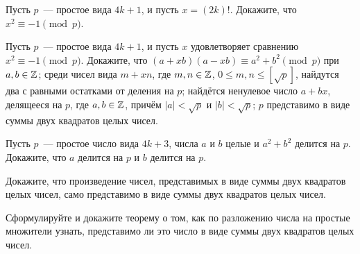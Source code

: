 \documentclass[a4paper,12pt]{article}
\begin{document}








 Пусть $p$~--- простое вида $4k + 1$, и пусть $x=(2k)!$. Докажите, что
$x^2 \equiv -1 \pmod{p}$.

 Пусть $p$~--- простое вида $4k + 1$, и пусть $x$ удовлетворяет сравнению $x^2 \equiv -1 \pmod{p}$. Докажите, что
 $(a + xb)(a - xb)\equiv a^2 + b^2 \pmod{p}$ при $a,b\in\mathbb{Z}$;
 среди чисел вида $m + xn$, где $m,n\in\mathbb{Z}$, $0 \leq m,n
\leq [\sqrt p]$, найдутся два с равными остатками от деления на $p$;
 найдётся ненулевое число $a + bx$, делящееся на
$p$, где $a,b\in\mathbb{Z}$, причём $|a|<\sqrt p$ и $|b|<\sqrt p$;
 $p$ представимо в виде суммы двух квадратов целых чисел.

 Пусть $p$~--- простое число вида $4k+3$, числа $a$ и $b$ целые и $a^2 + b^2$ делится на $p$.
Докажите, что $a$ делится на $p$ и $b$ делится на $p$. %

 Докажите, что произведение чисел, представимых в виде суммы
двух квадратов целых чисел, само представимо в виде суммы двух
квадратов целых чисел. 

 Сформулируйте и докажите теорему о том,
как по разложению числа на простые множители узнать, представимо ли это число
в виде суммы двух квадратов целых чисел.



\end{document}
